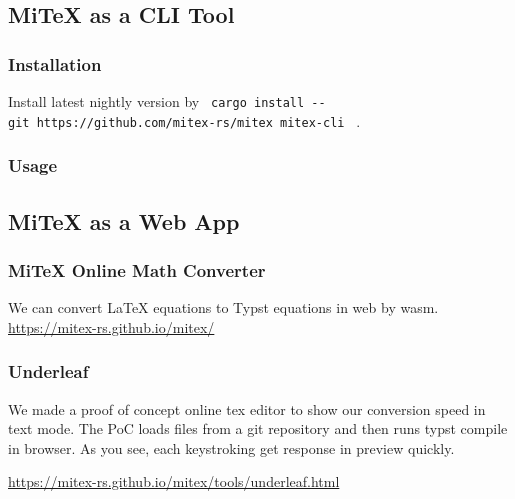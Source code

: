 \subsection{MiTeX as a CLI Tool}\label{mitex-as-a-cli-tool}

\subsubsection{Installation}\label{installation}

Install latest nightly version by
\texttt{\ cargo\ install\ -\/-git\ https://github.com/mitex-rs/mitex\ mitex-cli\ }
.

\subsubsection{Usage}\label{usage}

\begin{Shaded}
\begin{Highlighting}[]
\end{Highlighting}
\end{Shaded}

\subsection{MiTeX as a Web App}\label{mitex-as-a-web-app}

\subsubsection{MiTeX Online Math
Converter}\label{mitex-online-math-converter}

We can convert LaTeX equations to Typst equations in web by wasm.
\url{https://mitex-rs.github.io/mitex/}

\subsubsection{Underleaf}\label{underleaf}

We made a proof of concept online tex editor to show our conversion
speed in text mode. The PoC loads files from a git repository and then
runs typst compile in browser. As you see, each keystroking get response
in preview quickly.

\url{https://mitex-rs.github.io/mitex/tools/underleaf.html}

